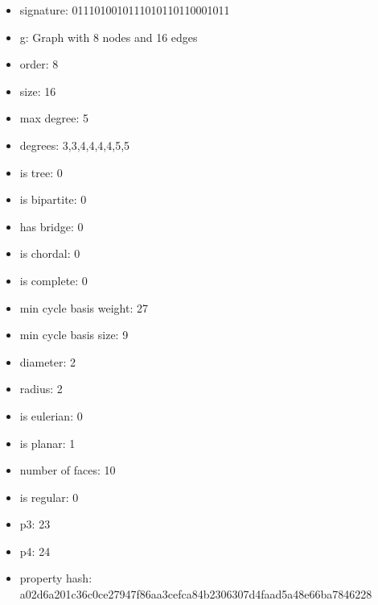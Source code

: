 \begin{itemize}
\item signature: 0111010010111010110110001011
\item g: Graph with 8 nodes and 16 edges
\item order: 8
\item size: 16
\item max degree: 5
\item degrees: 3,3,4,4,4,4,5,5
\item is tree: 0
\item is bipartite: 0
\item has bridge: 0
\item is chordal: 0
\item is complete: 0
\item min cycle basis weight: 27
\item min cycle basis size: 9
\item diameter: 2
\item radius: 2
\item is eulerian: 0
\item is planar: 1
\item number of faces: 10
\item is regular: 0
\item p3: 23
\item p4: 24
\item property hash: a02d6a201c36c0ce27947f86aa3cefca84b2306307d4faad5a48e66ba7846228
\end{itemize}
\newpage
\begin{figure}
\end{figure}
